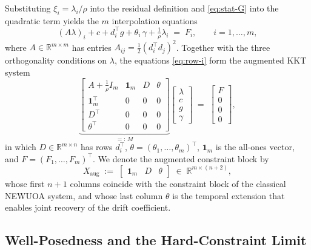 \documentclass[11pt,a4paper]{article}
\newcommand{\R}{\mathbb{R}}
\begin{document}
Substituting $\xi_i = \lambda_i/\rho$ into the residual definition
and \eqref{eq:stat-G} into the quadratic term yields the $m$
interpolation equations
\begin{equation}\label{eq:row-i}
  (A\lambda)_i + c + d_i^{\!\top}g + \theta_i\,\gamma
  + \tfrac{1}{\rho}\lambda_i \;=\; F_i,
  \qquad i = 1,\dots,m,
\end{equation}
where $A \in \R^{m\times m}$ has entries
$A_{ij} = \tfrac{1}{2}(d_i^\top d_j)^2$. Together with the three
orthogonality conditions on $\lambda$, the equations \eqref{eq:row-i}
form the augmented KKT system
\begin{equation}\label{eq:tobyqa-kkt}
  \underbrace{
  \begin{bmatrix}
     A + \tfrac{1}{\rho}I_m & \mathbf{1}_m & D & \theta \\
    \mathbf{1}_m^{\!\top} & 0 & 0 & 0 \\
    D^{\!\top} & 0 & 0 & 0 \\
    \theta^{\!\top} & 0 & 0 & 0
  \end{bmatrix}}_{=:\,M}
  \begin{bmatrix}\lambda\\c\\g\\\gamma\end{bmatrix}
  \;=\;
  \begin{bmatrix}F\\0\\0\\0\end{bmatrix},
\end{equation}
in which $D \in \R^{m\times n}$ has rows $d_i^\top$,
$\theta = (\theta_1, \dots, \theta_m)^\top$, $\mathbf{1}_m$ is the
all-ones vector, and $F = (F_1, \dots, F_m)^\top$. We denote the
augmented constraint block by
\begin{equation}\label{eq:Xaug-def}
  X_{\mathrm{aug}} \;:=\;
  \begin{bmatrix}\mathbf{1}_m & D & \theta\end{bmatrix}
  \;\in\;\R^{m\times(n+2)},
\end{equation}
whose first $n+1$ columns coincide with the constraint block of the
classical NEWUOA system, and whose last column $\theta$ is the
temporal extension that enables joint recovery of the drift
coefficient.

\subsection{Well-Posedness and the Hard-Constraint Limit}
\label{sec:well-posedness}
\end{document}
